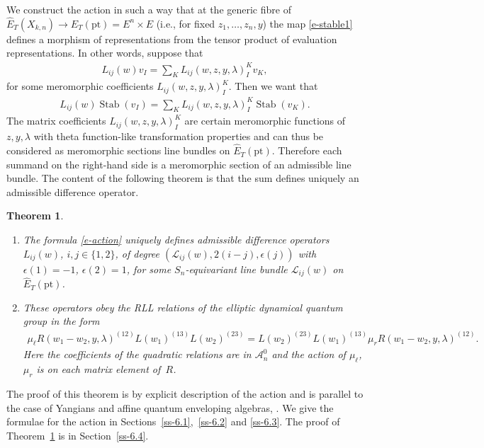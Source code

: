 \documentclass[pdftex]{sigma}
\numberwithin{equation}{section}
\newtheorem{Theorem}{Theorem}[section]
\begin{document}
We construct the action in such a way that at the generic fibre of $\hat E_T(X_{k,n})\to E_T(\mathrm{pt})=E^n\times E$ (i.e., for fixed $z_1,\dots,z_n,y$) the map \eqref{e-stable1} defines a morphism of representations from the tensor product of evaluation representations. In other words, suppose that
\begin{gather*}
 L_{ij}(w)v_I=\sum_K L_{ij}(w,z,y,\lambda)_I^Kv_K,
\end{gather*}
for some meromorphic coefficients $L_{ij}(w,z,y,\lambda)_I^K$. Then we want that
\begin{gather}\label{e-action}
 L_{ij}(w)\operatorname{Stab}(v_I) =\sum_K L_{ij}(w,z,y,\lambda)_I^K\operatorname{Stab}(v_K).
\end{gather}
The matrix coefficients $L_{ij}(w,z,y,\lambda)_I^K$ are certain meromorphic functions of $z,y,\lambda$ with theta function-like transformation properties and can thus be considered as meromorphic sections line bundles on $\hat E_T(\mathrm{pt})$. Therefore each summand on the right-hand side is a meromorphic section of an admissible line bundle. The content of the following theorem is that the sum defines uniquely an admissible difference operator.
\begin{Theorem}\label{th-2}\quad
\begin{enumerate}\itemsep=0pt
\item[$(i)$] The formula \eqref{e-action} uniquely defines admissible difference operators $L_{ij}(w)$, $i,j\in\{1,2\}$, of degree $(\mathcal L_{ij}(w),2(i-j),\epsilon(j))$ with $\epsilon(1)=-1$, $\epsilon(2)=1$, for some $S_n$-equivariant line bundle $\mathcal L_{ij}(w)$ on $\hat E_T(\mathrm{pt})$.
\item[$(ii)$] These operators obey the RLL relations of the elliptic dynamical quantum group in the form
 \begin{gather*}
 \mu_\ell R(w_1\!-w_2,y,\lambda)^{(12)} L(w_1)^{(13)} L(w_2)^{(23)} = L(w_2)^{(23)}L(w_1)^{(13)} \mu_rR(w_1\!-w_2,y,\lambda)^{(12)}.
 \end{gather*}
 Here the coefficients of the quadratic relations are in $\mathcal A^0_n$ and the action of $\mu_\ell$, $\mu_r$ is on each matrix element of~$R$.
\end{enumerate}
\end{Theorem}

The proof of this theorem is by explicit description of the action and is parallel to the case of Yangians and affine quantum enveloping algebras, \cite{GRTV,RTV2,RV2}. We give the formulae for the action in Sections~\ref{ss-6.1},~\ref{ss-6.2} and \ref{ss-6.3}. The proof of Theorem~\ref{th-2} is in Section~\ref{ss-6.4}.
\end{document}
